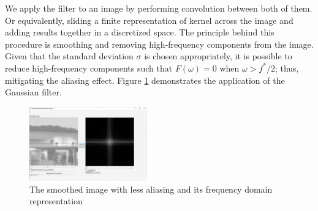 We apply the filter to an image by performing convolution between both of them. Or equivalently, sliding a finite representation of kernel across the image and adding results together in a discretized space. The principle behind this procedure is smoothing and removing high-frequency components from the image. Given that the standard deviation $\sigma$ is chosen appropriately, it is possible to reduce high-frequency components such that $F(\omega) = 0$ when $\omega > f^* / 2$; thus, mitigating the aliasing effect. Figure \ref{gaussian-image} demonstrates the application of the Gaussian filter.

\begin{figure}[h]
    \centering
    \includegraphics[width=0.45\textwidth]{figures/assignment3/cg3-gaussian.png}
    \caption{The smoothed image with less aliasing and its frequency domain representation}
    \label{gaussian-image}
\end{figure}

